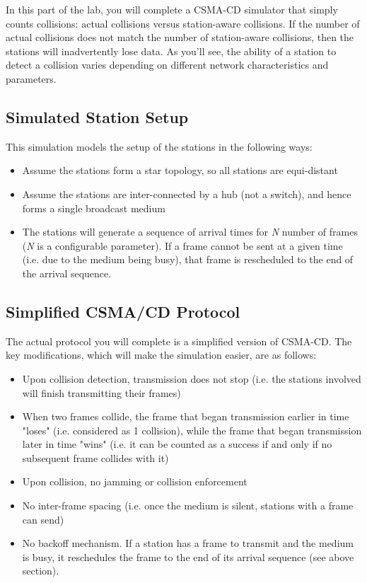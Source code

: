 \documentclass[11pt]{article}
\begin{document}
In this part of the lab, you will complete a CSMA-CD simulator that simply counts collisions: actual collisions versus station-aware collisions.
If the number of actual collisions does not match the number of station-aware collisions, then the stations will inadvertently lose data.
As you'll see, the ability of a station to detect a collision varies depending on different network characteristics and parameters.


\subsection{Simulated Station Setup}
\label{subsec:station-setup}
This simulation models the setup of the stations in the following ways:
\begin{itemize}
    \item Assume the stations form a star topology, so all stations are equi-distant
    \item Assume the stations are inter-connected by a hub (not a switch), and hence forms a single broadcast medium
    \item The stations will generate a sequence of arrival times for \textit{N} number of frames (\textit{N} is a configurable parameter). If a frame cannot be sent at a given time (i.e. due to the medium being busy), that frame is rescheduled to the end of the arrival sequence.
\end{itemize}

\subsection{Simplified CSMA/CD Protocol}
\label{subsec:simplified-csma-cd}
The actual protocol you will complete is a simplified version of CSMA-CD.
The key modifications, which will make the simulation easier, are as follows:
\begin{itemize}
    \item Upon collision detection, transmission does not stop (i.e. the stations involved will finish transmitting their frames)
    \item When two frames collide, the frame that began transmission earlier in time "loses" (i.e. considered as 1 collision), while the frame that began transmission later in time "wins" (i.e. it can be counted as a success if and only if no subsequent frame collides with it)
    \item Upon collision, no jamming or collision enforcement
    \item No inter-frame spacing (i.e. once the medium is silent, stations with a frame can send)
    \item No backoff mechanism. If a station has a frame to transmit and the medium is busy, it reschedules the frame to the end of its arrival sequence (see above section).
\end{itemize}
\end{document}
